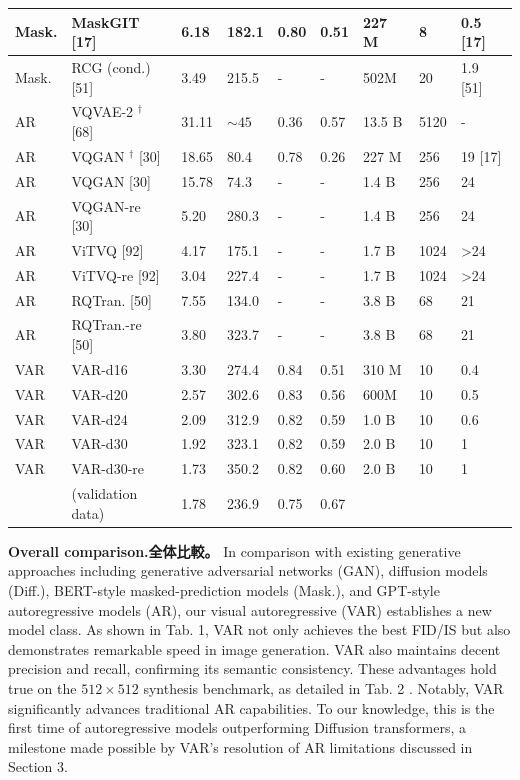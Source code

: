 \documentclass{article}
\begin{document}
\begin{table}[h]
\begin{center}
\begin{tabular}{|l|l|l|l|l|l|l|l|l|}
\hline
Mask. & MaskGIT [17] & 6.18 & 182.1 & 0.80 & 0.51 & 227 M & 8 & 0.5 [17] \\
\hline
Mask. & RCG (cond.) [51] & 3.49 & 215.5 & - & - & 502M & 20 & 1.9 [51] \\
\hline
AR & VQVAE-2 ${ }^{\dagger}$ [68] & 31.11 & $\sim 45$ & 0.36 & 0.57 & 13.5 B & 5120 & - \\
\hline
AR & VQGAN ${ }^{\dagger}$ [30] & 18.65 & 80.4 & 0.78 & 0.26 & 227 M & 256 & 19 [17] \\
\hline
AR & VQGAN [30] & 15.78 & 74.3 & - & - & 1.4 B & 256 & 24 \\
\hline
AR & VQGAN-re [30] & 5.20 & 280.3 & - & - & 1.4 B & 256 & 24 \\
\hline
AR & ViTVQ [92] & 4.17 & 175.1 & - & - & 1.7 B & 1024 & >24 \\
\hline
AR & ViTVQ-re [92] & 3.04 & 227.4 & - & - & 1.7 B & 1024 & >24 \\
\hline
AR & RQTran. [50] & 7.55 & 134.0 & - & - & 3.8 B & 68 & 21 \\
\hline
AR & RQTran.-re [50] & 3.80 & 323.7 & - & - & 3.8 B & 68 & 21 \\
\hline
VAR & VAR-d16 & 3.30 & 274.4 & 0.84 & 0.51 & 310 M & 10 & 0.4 \\
\hline
VAR & VAR-d20 & 2.57 & 302.6 & 0.83 & 0.56 & 600M & 10 & 0.5 \\
\hline
VAR & VAR-d24 & 2.09 & 312.9 & 0.82 & 0.59 & 1.0 B & 10 & 0.6 \\
\hline
VAR & VAR-d30 & 1.92 & 323.1 & 0.82 & 0.59 & 2.0 B & 10 & 1 \\
\hline
VAR & VAR-d30-re & 1.73 & 350.2 & 0.82 & 0.60 & 2.0 B & 10 & 1 \\
\hline
 & (validation data) & 1.78 & 236.9 & 0.75 & 0.67 &  &  &  \\
\hline
\end{tabular}
\end{center}
\end{table}

\textbf{Overall comparison.全体比較。} In comparison with existing generative approaches including generative adversarial networks (GAN), diffusion models (Diff.), BERT-style masked-prediction models (Mask.), and GPT-style autoregressive models (AR), our visual autoregressive (VAR) establishes a new model class. As shown in Tab. 1, VAR not only achieves the best FID/IS but also demonstrates remarkable speed in image generation. VAR also maintains decent precision and recall, confirming its semantic consistency. These advantages hold true on the $512 \times 512$ synthesis benchmark, as detailed in Tab. 2 . Notably, VAR significantly advances traditional AR capabilities. To our knowledge, this is the first time of autoregressive models outperforming Diffusion transformers, a milestone made possible by VAR's resolution of AR limitations discussed in Section 3.
\end{document}
